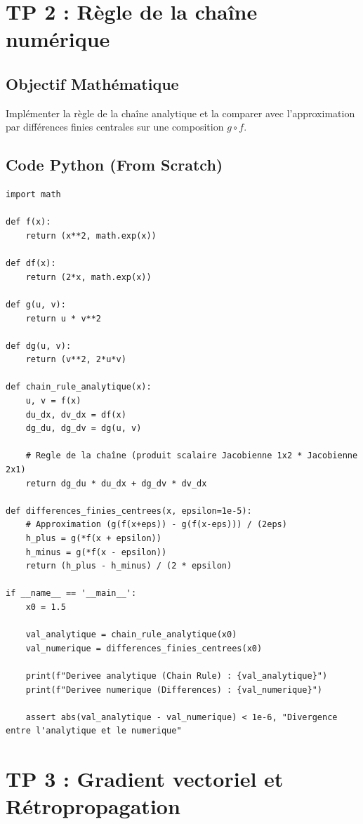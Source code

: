 \documentclass[11pt,a4paper]{article}
\begin{document}
\newpage
\section*{TP 2 : Règle de la chaîne numérique}

\subsection*{Objectif Mathématique}
Implémenter la règle de la chaîne analytique et la comparer avec l'approximation par différences finies centrales sur une composition $g \circ f$.

\subsection*{Code Python (From Scratch)}

\begin{lstlisting}
import math

def f(x):
    return (x**2, math.exp(x))

def df(x):
    return (2*x, math.exp(x))

def g(u, v):
    return u * v**2

def dg(u, v):
    return (v**2, 2*u*v)

def chain_rule_analytique(x):
    u, v = f(x)
    du_dx, dv_dx = df(x)
    dg_du, dg_dv = dg(u, v)

    # Regle de la chaîne (produit scalaire Jacobienne 1x2 * Jacobienne 2x1)
    return dg_du * du_dx + dg_dv * dv_dx

def differences_finies_centrees(x, epsilon=1e-5):
    # Approximation (g(f(x+eps)) - g(f(x-eps))) / (2eps)
    h_plus = g(*f(x + epsilon))
    h_minus = g(*f(x - epsilon))
    return (h_plus - h_minus) / (2 * epsilon)

if __name__ == '__main__':
    x0 = 1.5

    val_analytique = chain_rule_analytique(x0)
    val_numerique = differences_finies_centrees(x0)

    print(f"Derivee analytique (Chain Rule) : {val_analytique}")
    print(f"Derivee numerique (Differences) : {val_numerique}")

    assert abs(val_analytique - val_numerique) < 1e-6, "Divergence entre l'analytique et le numerique"
\end{lstlisting}

\newpage
\section*{TP 3 : Gradient vectoriel et Rétropropagation}
\end{document}
